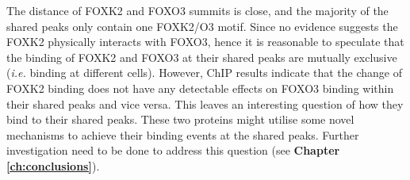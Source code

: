 The distance of FOXK2 and FOXO3 summits is close, and the majority of the shared peaks only contain one FOXK2/O3 motif. Since no evidence suggests the FOXK2 physically interacts with FOXO3, hence it is reasonable to speculate that the binding of FOXK2 and FOXO3 at their shared peaks are mutually exclusive (\textit{i.e.} binding at different cells). However, ChIP results indicate that the change of FOXK2 binding does not have any detectable effects on FOXO3 binding within their shared peaks and vice versa. This leaves an interesting question of how they bind to their shared peaks. These two proteins might utilise some novel mechanisms to achieve their binding events at the shared peaks. Further investigation need to be done to address this question (see \textbf{Chapter \ref{ch:conclusions}}).